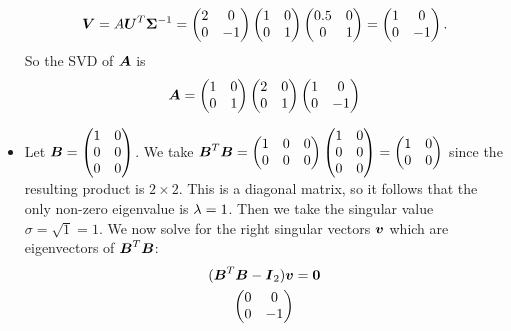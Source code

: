 \documentclass{report}
\newcommand{\Sg}{\mathbf{\Sigma}}
\begin{document}
\begin{itemize}
		$$\bmV=A\bmU^{T}\Sg^{-1}=\begin{pmatrix}
			2 & 0 \\ 0 & -1
		\end{pmatrix}\begin{pmatrix}
		1 & 0 \\ 0 & 1
		\end{pmatrix}\begin{pmatrix}
		0.5 & 0 \\ 0 & 1
		\end{pmatrix}=\begin{pmatrix}
		1 & 0 \\ 0 & -1
		\end{pmatrix}.$$
		So the SVD of $\boldsymbol{A}$ is
		$$\boldsymbol{A}=\begin{pmatrix}
			1 & 0 \\ 0 & 1
		\end{pmatrix}\begin{pmatrix}
		2 & 0 \\ 0 & 1
		\end{pmatrix}\begin{pmatrix}
		1 & 0 \\ 0 & -1
		\end{pmatrix}$$
		\item Let $\boldsymbol{B}=\begin{pmatrix}
			1 & 0 \\ 0 & 0 \\ 0 & 0
		\end{pmatrix}$. We take $\boldsymbol{B}^T\boldsymbol{B}=\begin{pmatrix}
		1 & 0 & 0 \\ 0 & 0 & 0
	\end{pmatrix}\begin{pmatrix}
	1 & 0 \\ 0 & 0 \\ 0 & 0
	\end{pmatrix}=\begin{pmatrix}
	1 & 0 \\ 0 & 0
	\end{pmatrix}$ since the resulting product is $2\times 2$. This is a diagonal matrix, so it follows that the only non-zero eigenvalue is $\lambda=1$. Then we take the singular value $\sigma=\sqrt{1}=1$. We now solve for the right singular vectors $\boldsymbol{v}$ which are eigenvectors of $\boldsymbol{B}^T\boldsymbol{B}$:
	\begin{align*}
		(\boldsymbol{B}^T\boldsymbol{B}-\boldsymbol{I}_2)\boldsymbol{v}&=\textbf{0}\\
		\begin{pmatrix}
			0 & 0 \\ 0 & -1

\end{pmatrix}
\end{align*}
\end{itemize}
\end{document}

